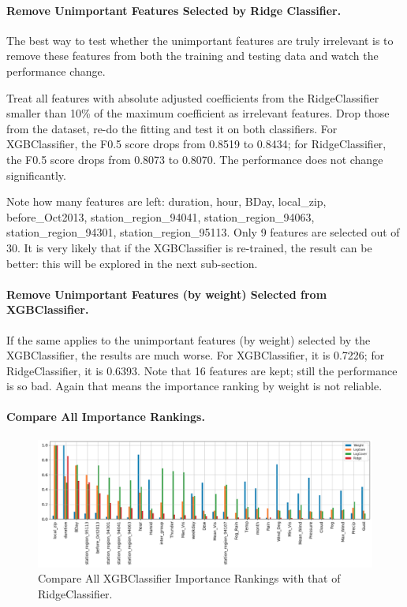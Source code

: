 \documentclass[a4paper]{article}
\begin{document}
			\paragraph{Remove Unimportant Features Selected by Ridge Classifier.}
			The best way to test whether the unimportant features are truly irrelevant is to remove these features from both the training and testing data and watch the performance change.
			
			Treat all features with absolute adjusted coefficients from the RidgeClassifier smaller than 10\% of the maximum coefficient as irrelevant features. Drop those from the dataset, re-do the fitting and test it on both classifiers. For XGBClassifier, the F0.5 score drops from 0.8519 to 0.8434; for RidgeClassifier, the F0.5 score drops from 0.8073 to 0.8070. The performance does not change significantly. 
			
			Note how many features are left: duration, hour, BDay, local\_zip, before\_Oct2013, station\_region\_94041, station\_region\_94063, station\_region\_94301, station\_region\_95113. Only 9 features are selected out of 30. It is very likely that if the XGBClassifier is re-trained, the result can be better: this will be explored in the next sub-section.
			
			\paragraph{Remove Unimportant Features (by weight) Selected from XGBClassifier.}
			If the same applies to the unimportant features (by weight) selected by the XGBClassifier, the results are much worse. For XGBClassifier, it is 0.7226; for RidgeClassifier, it is 0.6393. Note that 16 features are kept; still the performance is so bad. Again that means the importance ranking by weight is not reliable.
			
			\paragraph{Compare All Importance Rankings.}
			\begin{figure}
				\centering
				\includegraphics[width=1\textwidth]{CompareImportance.png}
				\caption{\label{fig:comp_importance}Compare All XGBClassifier Importance Rankings with that of RidgeClassifier.}	
			\end{figure}
			
\end{document}
